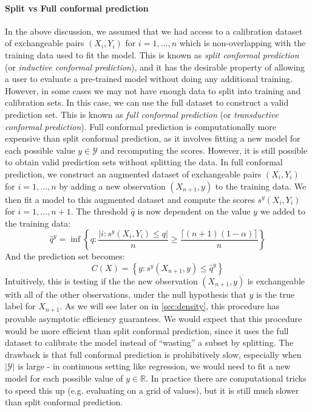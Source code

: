 \documentclass[a4paper, 12pt]{article}
\begin{document}
\paragraph*{Split vs Full conformal prediction} In the above discussion, we assumed that we had access to a calibration dataset of exchangeable pairs $(X_i, Y_i)$ for $i = 1, \ldots, n$ which is non-overlapping with the training data used to fit the model. This is known as \textit{split conformal prediction} (or \textit{inductive conformal prediction}), and it has the desirable property of allowing a user to evaluate a pre-trained model without doing any additional training. However, in some cases we may not have enough data to split into training and calibration sets. In this case, we can use the full dataset to construct a valid prediction set. This is known as \textit{full conformal prediction} (or \textit{transductive conformal prediction}). Full conformal prediction is computationally more expensive than split conformal prediction, as it involves fitting a new model for each possible value $y \in \mathcal{Y}$ and recomputing the scores. However, it is still possible to obtain valid prediction sets without splitting the data. In full conformal prediction, we construct an augmented dataset of exchangeable pairs $(X_i, Y_i)$ for $i = 1, \ldots, n$ by adding a new observation $(X_{n+1}, y)$ to the training data.
We then fit a model to this augmented dataset and compute the scores $s^y(X_i, Y_i)$ for $i = 1, \ldots, n+1$.
The threshold $\hat{q}$ is now dependent on the value $y$ we added to the training data:
\[ \hat{q}^y = \inf \left\{ q: \frac{\left| i : s^y(X_i, Y_i) \leq q \right|}{n} \geq \frac{\lceil (n+1)(1-\alpha) \rceil }{n} \right\} \]
And the prediction set becomes:
\[ C(X) = \left\{ y: s^y(X_{n+1}, y) \leq \hat{q}^y \right\} \]
Intuitively, this is testing if the the new observation $(X_{n+1}, y)$ is exchangeable with all of the other observations, under the null hypothesis that $y$ is the true label for $X_{n+1}$.
As we will see later on in \ref{sec:density}, this procedure has provable asymptotic efficiency guarantees. We would expect that this procedure would be more efficient than split conformal prediction, since it uses the full dataset to calibrate the model instead of ``wasting'' a subset by splitting. The drawback is that full conformal prediction is prohibitively slow, especially when $|\mathcal{Y}|$ is large - in continuous setting like regression, we would need to fit a new model for each possible value of $y \in \mathbb{R}$. In practice there are computational tricks to speed this up (e.g. evaluating on a grid of values), but it is still much slower than split conformal prediction.
\end{document}

